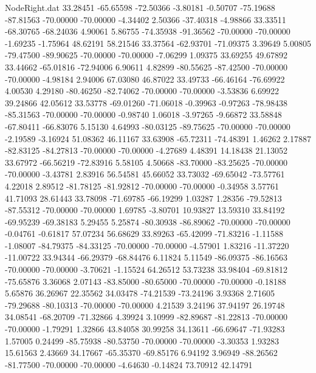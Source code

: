 \begin{filecontents}{NodeRight.dat}
  33.28451  -65.65598  -72.50366    -3.80181   -0.50707  -75.19688  -87.81563  -70.00000  -70.00000   -4.34402    2.50366  -37.40318   -4.98866
  33.33511  -68.30765  -68.24036     4.90061    5.86755  -74.35938  -91.36562  -70.00000  -70.00000   -1.69235   -1.75964   48.62191   58.21546
  33.37564  -62.93701  -71.09375     3.39649    5.00805  -79.47500  -89.90625  -70.00000  -70.00000   -7.06299    1.09375   33.69255   49.67892
  33.44662  -65.01816  -72.94006     6.90611    4.82899  -80.55625  -87.42500  -70.00000  -70.00000   -4.98184    2.94006   67.03080   46.87022
  33.49733  -66.46164  -76.69922     4.00530    4.29180  -80.46250  -82.74062  -70.00000  -70.00000   -3.53836    6.69922   39.24866   42.05612
  33.53778  -69.01260  -71.06018    -0.39963   -0.97263  -78.98438  -85.31563  -70.00000  -70.00000   -0.98740    1.06018   -3.97265   -9.66872
  33.58848  -67.80411  -66.83076     5.15130    4.64993  -80.03125  -89.75625  -70.00000  -70.00000   -2.19589   -3.16924   51.08362   46.11167
  33.63908  -65.72311  -74.48391     1.46262    2.17887  -82.83125  -84.27813  -70.00000  -70.00000   -4.27689    4.48391   14.18438   21.13052
  33.67972  -66.56219  -72.83916     5.58105    4.50668  -83.70000  -83.25625  -70.00000  -70.00000   -3.43781    2.83916   56.54581   45.66052
  33.73032  -69.65042  -73.57761     4.22018    2.89512  -81.78125  -81.92812  -70.00000  -70.00000   -0.34958    3.57761   41.71093   28.61443
  33.78098  -71.69785  -66.19299     1.03287    1.28356  -79.52813  -87.55312  -70.00000  -70.00000    1.69785   -3.80701   10.93827   13.59310
  33.84192  -69.95239  -69.38183     5.29455    5.25874  -80.30938  -86.89062  -70.00000  -70.00000   -0.04761   -0.61817   57.07234   56.68629
  33.89263  -65.42099  -71.83216    -1.11588   -1.08007  -84.79375  -84.33125  -70.00000  -70.00000   -4.57901    1.83216  -11.37220  -11.00722
  33.94344  -66.29379  -68.84476     6.11824    5.11549  -86.09375  -86.16563  -70.00000  -70.00000   -3.70621   -1.15524   64.26512   53.73238
  33.98404  -69.81812  -75.65876     3.36068    2.07143  -83.85000  -80.65000  -70.00000  -70.00000   -0.18188    5.65876   36.26967   22.35562
  34.03478  -74.21539  -73.24196     3.93368    2.71605  -79.29688  -80.10313  -70.00000  -70.00000    4.21539    3.24196   37.94197   26.19748
  34.08541  -68.20709  -71.32866     4.39924    3.10999  -82.89687  -81.22813  -70.00000  -70.00000   -1.79291    1.32866   43.84058   30.99258
  34.13611  -66.69647  -71.93283     1.57005    0.24499  -85.75938  -80.53750  -70.00000  -70.00000   -3.30353    1.93283   15.61563    2.43669
  34.17667  -65.35370  -69.85176     6.94192    3.96949  -88.26562  -81.77500  -70.00000  -70.00000   -4.64630   -0.14824   73.70912   42.14791

\end{filecontents}
